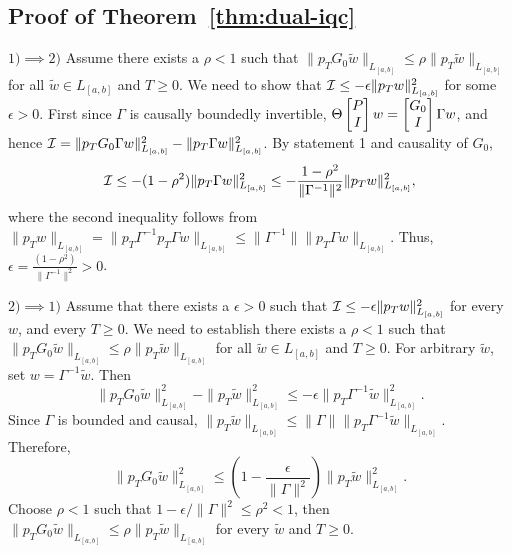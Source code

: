 \subsection{Proof of Theorem~\ref{thm:dual-iqc}}\label{proof:dual-iqc}
$1)\implies2)$ Assume there exists a $\rho<1$ such that
$\|p_T G_0\tilde w\|_{L_{[a,b]}}\leq\rho\|p_T \tilde w\|_{L_{[a,b]}}$
for all $\tilde{w}\in L_{[a,b]}$ and $T\geq0$. We need to show that
$\mathcal{I}\leq-\epsilon\|p_Tw\|_{L_{[a,b]}}^2$ for some $\epsilon>0$. First since $\Gamma$ is causally boundedly invertible,
$\Theta\begin{bmatrix}P\\I\end{bmatrix}w=\begin{bmatrix}G_0\\I\end{bmatrix}\Gamma w$, and hence
$\mathcal{I}=\|p_TG_0\Gamma  w\|_{L_{[a,b]}}^2-\|p_T\Gamma  w\|_{L_{[a,b]}}^2$. By statement 1 and causality of $G_0$,
\[
    \mathcal{I}\leq-(1-\rho^2)\|p_T\Gamma w\|_{L_{[a,b]}}^2
    \leq-\frac{1-\rho^2}{\|\Gamma^{-1}\|^2}\|p_Tw\|_{L_{[a,b]}}^2,
\]
where the second inequality follows from
$\|p_Tw\|_{L_{[a,b]}}=\|p_T\Gamma^{-1}p_T\Gamma w\|_{L_{[a,b]}}
\leq\|\Gamma^{-1}\|\|p_T\Gamma w\|_{L_{[a,b]}}$. Thus, $\epsilon=\frac{(1-\rho^2)}{\|\Gamma^{-1}\|^2}>0$.

$2)\implies1)$ Assume that there exists a $\epsilon > 0$ such that $\mathcal{I}\leq-\epsilon\|p_Tw\|_{L_{[a,b]}}^2$ for every $w$, and every $T\geq0$. 
We need to establish there exists a $\rho<1$ such that
$\|p_T G_0\tilde w\|_{L_{[a,b]}}\leq\rho\|p_T \tilde w\|_{L_{[a,b]}}$
for all $\tilde{w}\in L_{[a,b]}$ and $T\geq0$. For arbitrary $\tilde w$, 
set $w=\Gamma^{-1}\tilde w$. Then
\[
    \|p_TG_0\tilde w\|_{L_{[a,b]}}^2-\|p_T\tilde w\|_{L_{[a,b]}}^2
    \leq-\epsilon\|p_T\Gamma^{-1}\tilde w\|_{L_{[a,b]}}^2.
\]
Since $\Gamma$ is bounded and causal,
$\|p_T\tilde w\|_{L_{[a,b]}}\leq
\|\Gamma\|\|p_T\Gamma^{-1}\tilde w\|_{L_{[a,b]}}$. Therefore,
\[
    \|p_TG_0\tilde w\|_{L_{[a,b]}}^2
    \leq\left(1-\frac{\epsilon}{\|\Gamma\|^2}\right)
    \|p_T\tilde w\|_{L_{[a,b]}}^2.
\]
Choose $\rho<1$ such that $1-\epsilon/\|\Gamma\|^2\leq\rho^2<1$, 
then $\|p_TG_0\tilde w\|_{L_{[a,b]}}\leq\rho\|p_T\tilde w\|_{L_{[a,b]}}$
for every $\tilde w$ and $T\geq0$.


